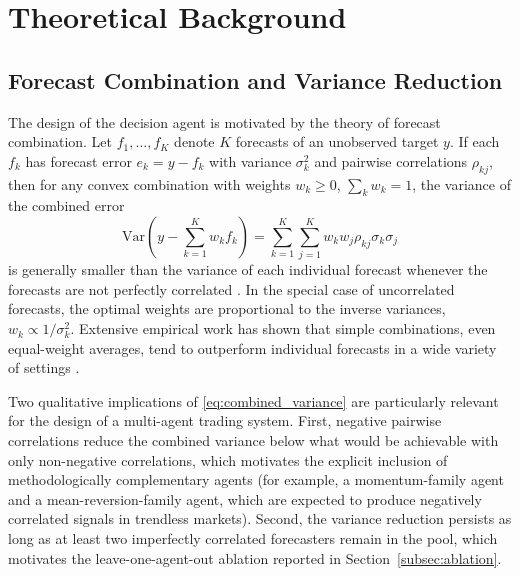 \documentclass{ieeeaccess}
\begin{document}
\section{Theoretical Background}
\label{sec:theory}

\subsection{Forecast Combination and Variance Reduction}

The design of the decision agent is motivated by the theory of forecast combination. Let $f_1, \ldots, f_K$ denote $K$ forecasts of an unobserved target $y$. If each $f_k$ has forecast error $e_k = y - f_k$ with variance $\sigma_k^2$ and pairwise correlations $\rho_{kj}$, then for any convex combination with weights $w_k \geq 0$, $\sum_k w_k = 1$, the variance of the combined error
\begin{equation}
\mathrm{Var}\!\left( y - \sum_{k=1}^{K} w_k f_k \right)
= \sum_{k=1}^{K} \sum_{j=1}^{K} w_k w_j \rho_{kj} \sigma_k \sigma_j
\label{eq:combined_variance}
\end{equation}
is generally smaller than the variance of each individual forecast whenever the forecasts are not perfectly correlated \cite{batesgranger1969,clemen1989,timmermann2006}. In the special case of uncorrelated forecasts, the optimal weights are proportional to the inverse variances, $w_k \propto 1/\sigma_k^2$. Extensive empirical work has shown that simple combinations, even equal-weight averages, tend to outperform individual forecasts in a wide variety of settings \cite{clemen1989,timmermann2006}.

Two qualitative implications of \eqref{eq:combined_variance} are particularly relevant for the design of a multi-agent trading system. First, negative pairwise correlations reduce the combined variance below what would be achievable with only non-negative correlations, which motivates the explicit inclusion of methodologically complementary agents (for example, a momentum-family agent and a mean-reversion-family agent, which are expected to produce negatively correlated signals in trendless markets). Second, the variance reduction persists as long as at least two imperfectly correlated forecasters remain in the pool, which motivates the leave-one-agent-out ablation reported in Section~\ref{subsec:ablation}.
\end{document}
